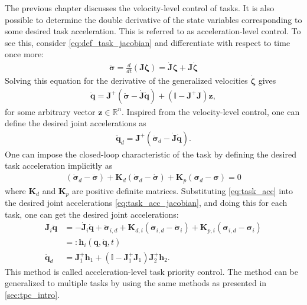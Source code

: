The previous chapter discusses the velocity-level control of tasks. It is also 
possible to determine the double derivative of the state variables corresponding to some
desired task acceleration. This is referred to as acceleration-level control.
To see this, consider \autoref{eq:def_task_jacobian} and differentiate
with respect to time once more:
\begin{align}
    \ddot{\bm{\sigma}} = \frac{d}{dt}\left(\bm{J} \bm{\zeta}\right) = \dot{\bm{J}} \bm{\zeta} + \bm{J} \dot{\bm{\zeta}}
    \label{eq:task_acc_jacobian}
\end{align}
Solving this equation for the derivative of the generalized velocities \(\dot{\bm{\zeta}}\) gives
\begin{align}
    \ddot{\bm{q}} = \bm{J}^{+} \left(\ddot{\bm{\sigma}} - \dot{\bm{J}}\dot{\bm{q}}\right) +
    \left(\mathbb{I} - \bm{J}^{+}\bm{J}\right) \bm{z} \label{eq:task_acc_control},
\end{align}
for some arbitrary vector $\bm{z} \in \mathbb{R}^n$. Inspired from the
velocity-level control, one can define the desired joint accelerations as
\begin{align}
    \ddot{\bm{q}}_d = \bm{J}^{+} \left(\ddot{\bm{\sigma}}_d
    - \dot{\bm{J}}\dot{\bm{q}}\right) \label{eq:task_priority_acc}.
\end{align}
One can impose the closed-loop characteristic of the task by defining the desired
task acceleration implicitly as
\begin{align}
    \left(\ddot{\bm{\sigma}}_d - \ddot{\bm{\sigma}}\right) +
    \bm{K}_d\left(\dot{\bm{\sigma}}_d - \dot{\bm{\sigma}}\right) +
    \bm{K}_p\left(\bm{\sigma}_d - \bm{\sigma}\right) = 0 \label{eq:task_acc}
\end{align}
where $\bm{K}_d$ and $\bm{K}_p$ are positive definite matrices. Substituting
\autoref{eq:task_acc} into the desired joint accelerations \autoref{eq:task_acc_jacobian},
and doing this for each task, one can get the desired joint accelerations:
\begin{subequations}
\begin{align}
    \bm{J}_i\ddot{\bm{q}} &= -\dot{\bm{J}}_i\dot{\bm{q}} + \ddot{\bm{\sigma}}_{i,d} 
    + \bm{K}_{d,i}\left(\dot{\bm{\sigma}}_{i,d} - \dot{\bm{\sigma}}_i\right)
    + \bm{K}_{p,i}\left(\bm{\sigma}_{i,d} - \bm{\sigma}_i\right) \\
    &=: \bm{h}_i(\bm{q}, \dot{\bm{q}}, t) \\
    \ddot{\bm{q}}_d &= \bm{J}_1^{+} \bm{h}_1 + \left(\mathbb{I} - \bm{J}_1^+\bm{J}_1\right) \bm{J}_2^{+} \bm{h}_2.
\end{align}
\end{subequations}
This method is called acceleration-level task priority control. The method can
be generalized to multiple tasks by using the same methods as presented in \autoref{sec:tpc_intro}.

